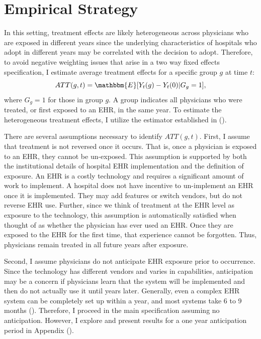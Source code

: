 \documentclass[11pt]{article}
\begin{document}
\section{Empirical Strategy}

In this setting, treatment effects are likely heterogeneous across physicians who are exposed in different years since the underlying characteristics of hospitals who adopt in different years may be correlated with the decision to adopt. Therefore, to avoid negative weighting issues that arise in a two way fixed effects specification, I estimate average treatment effects for a specific group $g$ at time $t$: 
$$ATT(g,t)=\mathbbm{E}[Y_t(g)-Y_t(0)|G_g=1],$$
where $G_g=1$ for those in group $g$. A group indicates all physicians who were treated, or first exposed to an EHR, in the same year. To estimate the heterogeneous treatment effects, I utilize the estimator established in \citeauthor{callaway2021difference} (\citeyear{callaway2021difference}).

There are several assumptions necessary to identify $ATT(g,t)$. First, I assume that treatment is not reversed once it occurs. That is, once a physician is exposed to an EHR, they cannot be un-exposed. This assumption is supported by both the institutional details of hospital EHR implementation and the definition of exposure. An EHR is a costly technology and requires a significant amount of work to implement. A hospital does not have incentive to un-implement an EHR once it is implemented. They may add features or switch vendors, but do not reverse EHR use. Further, since we think of treatment at the EHR level as exposure to the technology, this assumption is automatically satisfied when thought of as whether the physician has ever used an EHR. Once they are exposed to the EHR for the first time, that experience cannot be forgotten. Thus, physicians remain treated in all future years after exposure.

Second, I assume physicians do not anticipate EHR exposure prior to occurrence. Since the technology has different vendors and varies in capabilities, anticipation may be a concern if physicians learn that the system will be implemented and then do not actually use it until years later. Generally, even a complex EHR system can be completely set up within a year, and most systems take 6 to 9 months (\cite{uzialko_2021}). Therefore, I proceed in the main specification assuming no anticipation. However, I explore and present results for a one year anticipation period in Appendix (). 
\end{document}
